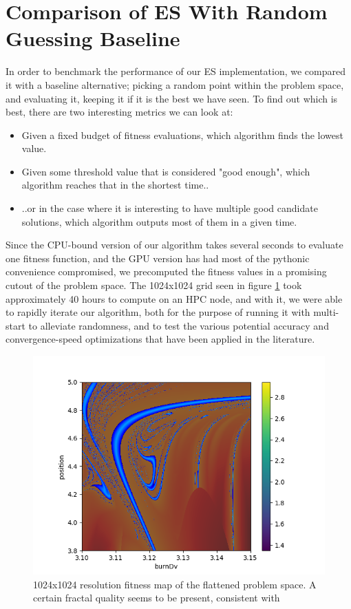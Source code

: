 \section{Comparison of ES With Random Guessing Baseline}
In order to benchmark the performance of our ES implementation, we compared it with a baseline alternative; picking a random point within the problem space, and evaluating it, keeping it if it is the best we have seen. To find out which is best, there are two interesting metrics we can look at: 
\begin{itemize}
    \item Given a fixed budget of fitness evaluations, which algorithm finds the lowest value.
    \item Given some threshold value that is considered "good enough", which algorithm reaches that in the shortest time..
    \item ..or in the case where it is interesting to have multiple good candidate solutions, which algorithm outputs most of them in a given time.
\end{itemize}
Since the CPU-bound version of our algorithm takes several seconds to evaluate one fitness function, and the GPU version has had most of the pythonic convenience compromised, we precomputed the fitness values in a promising cutout of the problem space. The 1024x1024 grid seen in figure \ref{fig:golf_course_s1024} took approximately 40 hours to compute on an HPC node, and with it, we were able to rapidly iterate our algorithm, both for the purpose of running it with multi-start to alleviate randomness, and to test the various potential accuracy and convergence-speed optimizations that have been applied in the literature.
\begin{figure}[h]
    \centering
    \includegraphics{fig/golf_course_s1024}
    \caption{1024x1024 resolution fitness map of the flattened problem space. A certain fractal quality seems to be present, consistent with \cite{Topputo2014}}
    \label{fig:golf_course_s1024}
\end{figure}